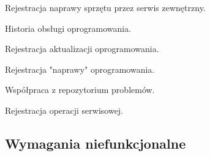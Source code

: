 \begin{myEnumerate}
\begin{myEnumerate}
\begin{myEnumerate}
			\item Rejestracja naprawy sprzętu przez serwis zewnętrzny.
			\end{myEnumerate}
		\item Historia obsługi oprogramowania.
		\begin{myEnumerate}
		\item Rejestracja aktualizacji oprogramowania.
		\item Rejestracja "naprawy" oprogramowania.
		\end{myEnumerate}
		\item Współpraca z repozytorium problemów.
		\begin{myEnumerate}
		\item Rejestracja operacji serwisowej.
		\end{myEnumerate}
	\end{myEnumerate}
\end{myEnumerate}
\subsection{Wymagania niefunkcjonalne}


